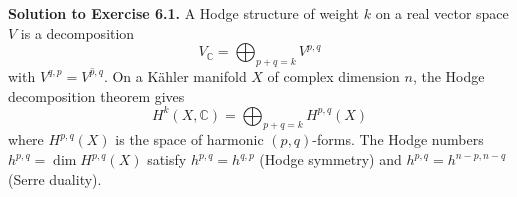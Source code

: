 \begin{solution}
\textbf{Solution to Exercise 6.1.}
A Hodge structure of weight $k$ on a real vector space $V$ is a decomposition
\[
V_\mathbb{C} = \bigoplus_{p+q=k} V^{p,q}
\]
with $V^{q,p} = \overline{V^{p,q}}$. On a K\"{a}hler manifold $X$ of complex dimension $n$, the Hodge decomposition theorem gives
\[
H^k(X, \mathbb{C}) = \bigoplus_{p+q=k} H^{p,q}(X)
\]
where $H^{p,q}(X)$ is the space of harmonic $(p,q)$-forms. The Hodge numbers $h^{p,q} = \dim H^{p,q}(X)$ satisfy $h^{p,q} = h^{q,p}$ (Hodge symmetry) and $h^{p,q} = h^{n-p,n-q}$ (Serre duality).
\end{solution}
